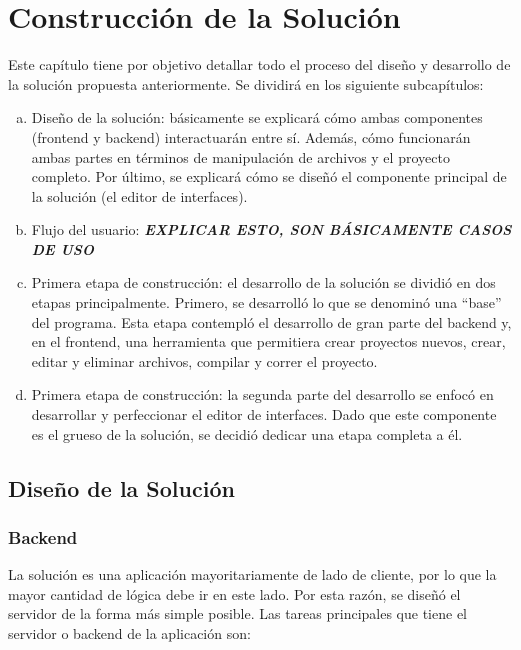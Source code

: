 \documentclass[12pt,titlepage,]{article}
\begin{document}
\newpage

\section{Construcción de la Solución}

Este capítulo tiene por objetivo detallar todo el proceso del diseño y
desarrollo de la solución propuesta anteriormente. Se dividirá en los
siguiente subcapítulos:

\begin{enumerate}[a.]
\item
  Diseño de la solución: básicamente se explicará cómo ambas componentes
  (frontend y backend) interactuarán entre sí. Además, cómo funcionarán
  ambas partes en términos de manipulación de archivos y el proyecto
  completo. Por último, se explicará cómo se diseñó el componente
  principal de la solución (el editor de interfaces).
\item
  Flujo del usuario: \textbf{\emph{EXPLICAR ESTO, SON BÁSICAMENTE CASOS
  DE USO}}
\item
  Primera etapa de construcción: el desarrollo de la solución se dividió
  en dos etapas principalmente. Primero, se desarrolló lo que se
  denominó una ``base'' del programa. Esta etapa contempló el desarrollo
  de gran parte del backend y, en el frontend, una herramienta que
  permitiera crear proyectos nuevos, crear, editar y eliminar archivos,
  compilar y correr el proyecto.
\item
  Primera etapa de construcción: la segunda parte del desarrollo se
  enfocó en desarrollar y perfeccionar el editor de interfaces. Dado que
  este componente es el grueso de la solución, se decidió dedicar una
  etapa completa a él.
\end{enumerate}

\subsection{Diseño de la Solución}

\subsubsection{Backend}

La solución es una aplicación mayoritariamente de lado de cliente, por
lo que la mayor cantidad de lógica debe ir en este lado. Por esta razón,
se diseñó el servidor de la forma más simple posible. Las tareas
principales que tiene el servidor o backend de la aplicación son:
\end{document}
